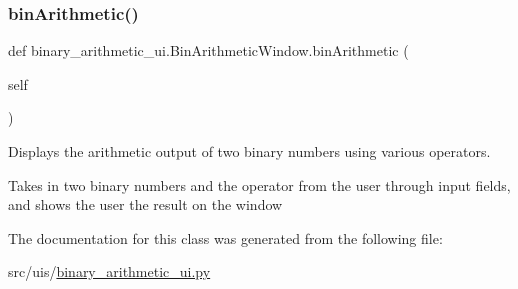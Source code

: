 \subsubsection{\texorpdfstring{bin\+Arithmetic()}{binArithmetic()}}
{\footnotesize\ttfamily def binary\+\_\+arithmetic\+\_\+ui.\+Bin\+Arithmetic\+Window.\+bin\+Arithmetic (\begin{DoxyParamCaption}\item[{}]{self }\end{DoxyParamCaption})}



Displays the arithmetic output of two binary numbers using various operators. 

Takes in two binary numbers and the operator from the user through input fields, and shows the user the result on the window 

The documentation for this class was generated from the following file\+:\begin{DoxyCompactItemize}
\item 
src/uis/\hyperlink{binary__arithmetic__ui_8py}{binary\+\_\+arithmetic\+\_\+ui.\+py}\end{DoxyCompactItemize}
